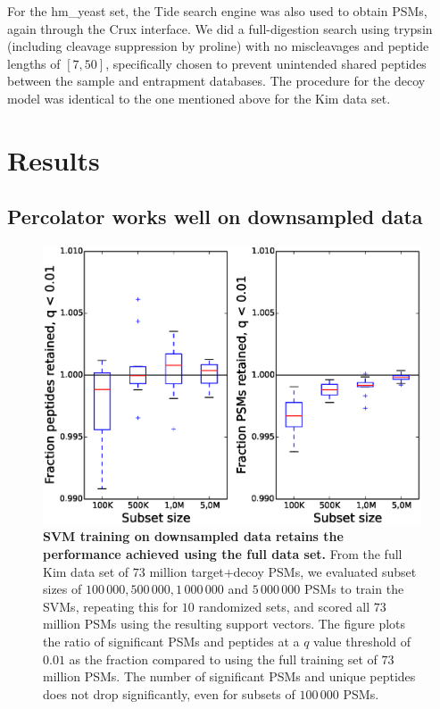 \documentclass{article}
\begin{document}
For the hm\_yeast set, the Tide search engine was also used to obtain
PSMs, again through the Crux interface. We did a full-digestion search
using trypsin (including cleavage suppression by proline) with no
miscleavages and peptide lengths of $[7,50]$, specifically chosen to
prevent unintended shared peptides between the sample and entrapment
databases. The procedure for the decoy model was identical to the one 
mentioned above for the Kim data set.

\section*{Results}

\subsection*{Percolator works well on downsampled data}

\begin{figure}
\begin{center}
\includegraphics[width=0.6\linewidth]{./img/subset-performance}
\caption{\label{fig:subset}\textbf{SVM training on downsampled data
    retains the performance achieved using the full data set.}  From
  the full Kim data set of $73$ million target+decoy PSMs, we
  evaluated subset sizes of $100\,000, 500\,000, 1\,000\,000$ and
  $5\,000\,000$ PSMs to train the SVMs, repeating this for $10$
  randomized sets, and scored all $73$ million PSMs using the
  resulting support vectors. The figure plots the ratio of significant PSMs
  and peptides at a $q$ value threshold of $0.01$ as the fraction
  compared to using the full training set of $73$ million PSMs. The
  number of significant PSMs and unique peptides does not drop
  significantly, even for subsets of $100\,000$ PSMs.}
\end{center}
\end{figure}
\end{document}
